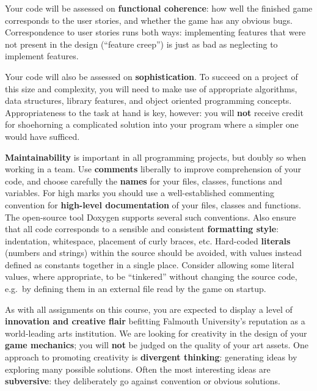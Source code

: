 \documentclass{../fal_assignment}
\begin{document}
Your code will be assessed on \textbf{functional coherence}:
how well the finished game corresponds to the user stories,
and whether the game has any obvious bugs.
Correspondence to user stories runs both ways:
implementing features that were not present in the design (``feature creep'')
is just as bad as neglecting to implement features.

Your code will also be assessed on \textbf{sophistication}.
To succeed on a project of this size and complexity,
you will need to make use of appropriate algorithms, data structures, library features, and object oriented programming concepts.
Appropriateness to the task at hand is key, however:
you will \textbf{not} receive credit for shoehorning a complicated solution into your program
where a simpler one would have sufficed.

\textbf{Maintainability} is important in all programming projects,
but doubly so when working in a team.
Use \textbf{comments} liberally to improve comprehension of your code,
and choose carefully the \textbf{names} for your files, classes, functions and variables.
For high marks you should use a well-established commenting convention
for \textbf{high-level documentation} of your files, classes and functions.
The open-source tool Doxygen supports several such conventions.
Also ensure that all code corresponds to a sensible and consistent \textbf{formatting style}:
indentation, whitespace, placement of curly braces, etc.
Hard-coded \textbf{literals} (numbers and strings) within the source should be avoided,
with values instead defined as constants together in a single place.
Consider allowing some literal values, where appropriate, to be ``tinkered'' without changing the source code,
e.g.\ by defining them in an external file read by the game on startup.

As with all assignments on this course, you are expected to display a level of
\textbf{innovation and creative flair} befitting Falmouth University's reputation as a world-leading
arts institution.
We are looking for creativity in the design of your \textbf{game mechanics};
you will \textbf{not} be judged on the quality of your art assets.
One approach to promoting creativity is
\textbf{divergent thinking}: generating ideas by exploring many possible solutions.
Often the most interesting ideas are \textbf{subversive}: they deliberately go against
convention or obvious solutions.
\end{document}
